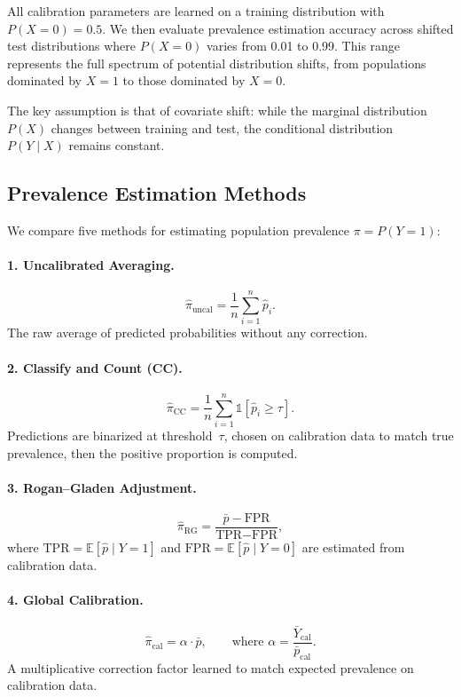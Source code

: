 \documentclass[12pt]{article}
\begin{document}
All calibration parameters are learned on a training distribution with
$P(X=0) = 0.5$. We then evaluate prevalence estimation accuracy across
shifted test distributions where $P(X=0)$ varies from 0.01 to 0.99. This
range represents the full spectrum of potential distribution shifts, from
populations dominated by $X=1$ to those dominated by $X=0$.

The key assumption is that of covariate shift: while the marginal
distribution $P(X)$ changes between training and test, the conditional
distribution $P(Y \mid X)$ remains constant.

\subsection{Prevalence Estimation Methods}

We compare five methods for estimating population prevalence
$\pi = P(Y=1)$:

\paragraph{1. Uncalibrated Averaging.}
\[
  \hat{\pi}_{\text{uncal}} = \frac{1}{n}\sum_{i=1}^{n} \hat{p}_i.
\]
The raw average of predicted probabilities without any correction.

\paragraph{2. Classify and Count (CC).}
\[
  \hat{\pi}_{\text{CC}} = \frac{1}{n}\sum_{i=1}^{n}
    \mathbb{1}[\hat{p}_i \geq \tau].
\]
Predictions are binarized at threshold~$\tau$, chosen on calibration data
to match true prevalence, then the positive proportion is computed.

\paragraph{3. Rogan--Gladen Adjustment.}
\[
  \hat{\pi}_{\text{RG}} = \frac{\bar{p} - \text{FPR}}
    {\text{TPR} - \text{FPR}},
\]
where $\text{TPR} = \mathbb{E}[\hat{p} \mid Y=1]$ and
$\text{FPR} = \mathbb{E}[\hat{p} \mid Y=0]$ are estimated from
calibration data.

\paragraph{4. Global Calibration.}
\[
  \hat{\pi}_{\text{cal}} = \alpha \cdot \bar{p}, \qquad \text{where }
  \alpha = \frac{\bar{Y}_{\text{cal}}}{\bar{p}_{\text{cal}}}.
\]
A multiplicative correction factor learned to match expected prevalence on
calibration data.
\end{document}
